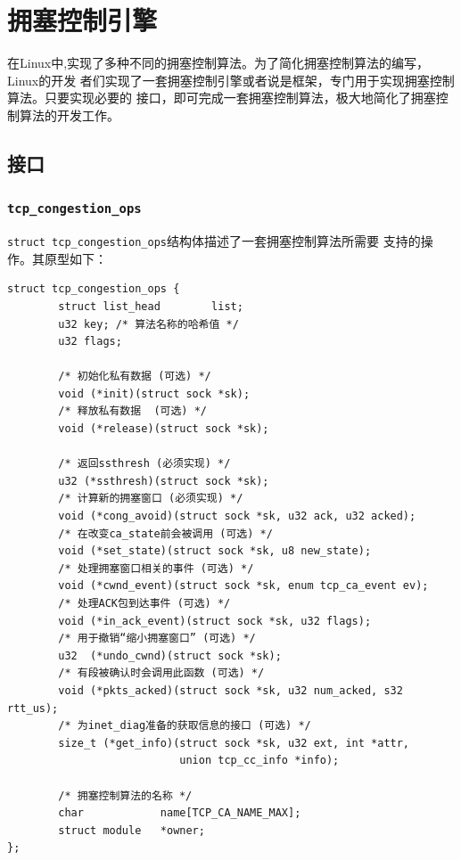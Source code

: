 \section{拥塞控制引擎}
\label{sec:congestion_control_engine}
在Linux中,实现了多种不同的拥塞控制算法。为了简化拥塞控制算法的编写，Linux的开发
者们实现了一套拥塞控制引擎或者说是框架，专门用于实现拥塞控制算法。只要实现必要的
接口，即可完成一套拥塞控制算法，极大地简化了拥塞控制算法的开发工作。

\subsection{接口}
\label{subsec:congestion_control_interface}

\subsubsection{\texttt{tcp_congestion_ops}}
\texttt{struct tcp_congestion_ops}结构体描述了一套拥塞控制算法所需要
支持的操作。其原型如下：
\begin{verbatim}
struct tcp_congestion_ops {
        struct list_head        list;
        u32 key; /* 算法名称的哈希值 */
        u32 flags;

        /* 初始化私有数据 (可选) */
        void (*init)(struct sock *sk);
        /* 释放私有数据  (可选) */
        void (*release)(struct sock *sk);

        /* 返回ssthresh (必须实现) */
        u32 (*ssthresh)(struct sock *sk);
        /* 计算新的拥塞窗口 (必须实现) */
        void (*cong_avoid)(struct sock *sk, u32 ack, u32 acked);
        /* 在改变ca_state前会被调用 (可选) */
        void (*set_state)(struct sock *sk, u8 new_state);
        /* 处理拥塞窗口相关的事件 (可选) */
        void (*cwnd_event)(struct sock *sk, enum tcp_ca_event ev);
        /* 处理ACK包到达事件 (可选) */
        void (*in_ack_event)(struct sock *sk, u32 flags);
        /* 用于撤销“缩小拥塞窗口” (可选) */
        u32  (*undo_cwnd)(struct sock *sk);
        /* 有段被确认时会调用此函数 (可选) */
        void (*pkts_acked)(struct sock *sk, u32 num_acked, s32 rtt_us);
        /* 为inet_diag准备的获取信息的接口 (可选) */
        size_t (*get_info)(struct sock *sk, u32 ext, int *attr,
                           union tcp_cc_info *info);

        /* 拥塞控制算法的名称 */
        char            name[TCP_CA_NAME_MAX];
        struct module   *owner;
};
\end{verbatim}

